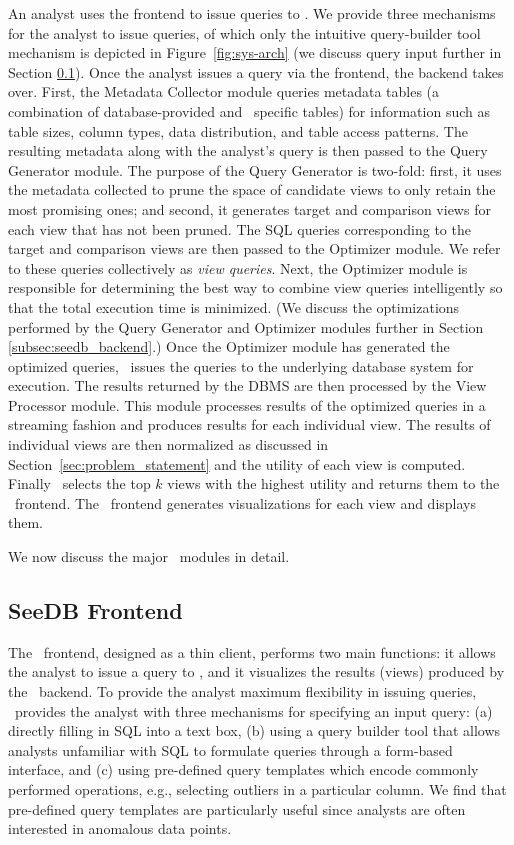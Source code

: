 An analyst uses the frontend to issue queries to \SeeDB. We provide three
mechanisms for the analyst to issue queries, of which only the intuitive
query-builder tool mechanism is depicted in Figure~\ref{fig:sys-arch} 
(we discuss query input further in Section \ref{subsec:seedb_frontend}).
Once the analyst issues a query via the frontend, the backend
takes over.
First, the Metadata Collector module queries metadata tables (a combination of
database-provided and \SeeDB\ specific tables) for information such as table
sizes, column types, data distribution, and table access patterns.
The resulting metadata along with the analyst's query is then passed to the
Query Generator module. The purpose of the Query Generator is two-fold:
first, it uses the metadata collected to prune the space of
candidate views to only retain the most promising ones; and second, it generates target and
comparison views for each view that has not been pruned.
The SQL queries corresponding to the target and comparison views are then passed
to the Optimizer module. We refer to these queries collectively as {\it view
queries}.
Next, the Optimizer module is responsible for determining the best way to combine
view queries intelligently so that the total execution time is minimized. 
(We discuss the optimizations performed by the Query Generator and
Optimizer modules further in Section \ref{subsec:seedb_backend}.) Once the
Optimizer module has generated the optimized queries, \SeeDB\ issues the
queries to the underlying database system for execution. The results returned by
the DBMS are then processed by the View Processor module. This module processes
results of the optimized queries in a streaming fashion and produces results for
each individual view. The results of individual views are then normalized as discussed
in Section~\ref{sec:problem_statement} and the utility of each view is computed.
Finally \SeeDB\ selects the top $k$ views with the highest utility and returns them to the
\SeeDB\ frontend. The \SeeDB\ frontend generates visualizations for each
view and displays them.

We now discuss the major \SeeDB\ modules in detail.

\subsection{SeeDB Frontend}
\label{subsec:seedb_frontend}

The \SeeDB\ frontend, designed as a thin client, performs two main functions: it
allows the analyst to issue a query to \SeeDB, 
and it visualizes the results (views) produced by the \SeeDB\
backend.
To provide the analyst maximum flexibility in issuing queries, \SeeDB\
provides the analyst with three
mechanisms for specifying an input query: 
(a) directly filling in SQL into a text box, 
(b) using a query builder tool that allows analysts
unfamiliar with SQL to formulate queries through a form-based interface, and (c)
using pre-defined query templates which encode commonly performed operations,
e.g., selecting outliers in a particular column. We find that pre-defined query
templates are particularly useful since analysts are often interested in
anomalous data points.

